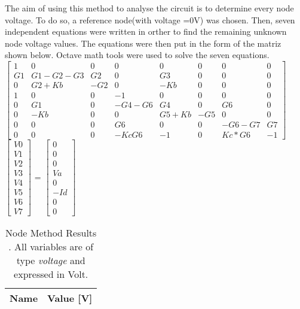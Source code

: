 The aim of using this method to analyse the circuit is to determine every node voltage. To do so, a reference node(with voltage =0V) was chosen. Then, seven independent equations were written in orther to find the remaining unknown node voltage values. The equations were then put in the form of the matriz shown below. Octave math tools were used to solve the seven equations.\\


$\begin{bmatrix}
1 & 0 & 0 & 0 & 0 & 0 & 0 & 0\\
G1 & G1-G2-G3 & G2 & 0 & G3 & 0 & 0 & 0\\
0 & G2+Kb & -G2 & 0 & -Kb & 0 & 0 & 0\\
1 & 0 & 0 & -1 & 0 & 0 & 0 & 0\\
0 & G1 & 0 & -G4-G6 & G4 & 0 & G6 & 0\\
0 & -Kb & 0 & 0 & G5+Kb & -G5 & 0 & 0\\
0 & 0 & 0 & G6 & 0 & 0 & -G6-G7 & G7\\
0 & 0 & 0 & -KcG6 & -1 & 0 & Kc*G6 & -1
\end{bmatrix}$
$\begin{bmatrix}
V0 \\ V1 \\ V2 \\ V3 \\ V4 \\ V5 \\ V6 \\ V7
\end{bmatrix}$
= 
$\begin{bmatrix}
0 \\ 0 \\ 0 \\ Va \\ 0 \\ -Id \\ 0 \\ 0
\end{bmatrix}$

\begin{table}[h]
  \centering
  \begin{tabular}{|l|r|}
    \hline    
    {\bf Name} & {\bf Value [V]} \\ \hline
    
  \end{tabular}
  \caption{Node Method Results . All variables are of type {\it voltage} and expressed in
    Volt.}
  \label{tab:nos}
\end{table}


